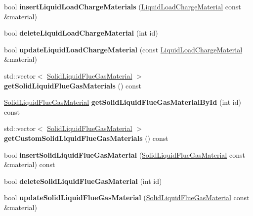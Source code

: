 \begin{DoxyCompactItemize}
bool {\bfseries insert\+Liquid\+Load\+Charge\+Materials} (\hyperlink{class_liquid_load_charge_material}{Liquid\+Load\+Charge\+Material} const \&material)
\item 
\mbox{\label{class_s_q_lite_a2a3451cb60446d9a90da4cb08920dcfe}} 
bool {\bfseries delete\+Liquid\+Load\+Charge\+Material} (int id)
\item 
\mbox{\label{class_s_q_lite_a89805e7aeb9d72f5dfa6928aac681eab}} 
bool {\bfseries update\+Liquid\+Load\+Charge\+Material} (const \hyperlink{class_liquid_load_charge_material}{Liquid\+Load\+Charge\+Material} \&material)
\item 
\mbox{\label{class_s_q_lite_aecba5bffe035af787b17b5bf5997d825}} 
std\+::vector$<$ \hyperlink{class_solid_liquid_flue_gas_material}{Solid\+Liquid\+Flue\+Gas\+Material} $>$ {\bfseries get\+Solid\+Liquid\+Flue\+Gas\+Materials} () const
\item 
\mbox{\label{class_s_q_lite_aa7ea5aa679227d695fe38848236281ee}} 
\hyperlink{class_solid_liquid_flue_gas_material}{Solid\+Liquid\+Flue\+Gas\+Material} {\bfseries get\+Solid\+Liquid\+Flue\+Gas\+Material\+By\+Id} (int id) const
\item 
\mbox{\label{class_s_q_lite_a23b34dae2fa12690d3718755fc373b42}} 
std\+::vector$<$ \hyperlink{class_solid_liquid_flue_gas_material}{Solid\+Liquid\+Flue\+Gas\+Material} $>$ {\bfseries get\+Custom\+Solid\+Liquid\+Flue\+Gas\+Materials} () const
\item 
\mbox{\label{class_s_q_lite_aa1de7450c37a07dfd0541fdf0dc164ef}} 
bool {\bfseries insert\+Solid\+Liquid\+Flue\+Gas\+Material} (\hyperlink{class_solid_liquid_flue_gas_material}{Solid\+Liquid\+Flue\+Gas\+Material} const \&material) const
\item 
\mbox{\label{class_s_q_lite_ac83353062d75af65c5b01d55570d0ead}} 
bool {\bfseries delete\+Solid\+Liquid\+Flue\+Gas\+Material} (int id)
\item 
\mbox{\label{class_s_q_lite_aed13c3aeeef3fdf7f3b2d72b61dd93e8}} 
bool {\bfseries update\+Solid\+Liquid\+Flue\+Gas\+Material} (\hyperlink{class_solid_liquid_flue_gas_material}{Solid\+Liquid\+Flue\+Gas\+Material} const \&material)

\end{DoxyCompactItemize}
